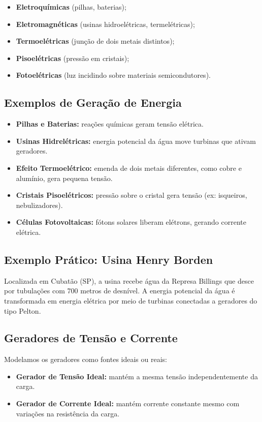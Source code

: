 \begin{itemize}
    \item \textbf{Eletroquímicas} (pilhas, baterias);
    \item \textbf{Eletromagnéticas} (usinas hidroelétricas, termelétricas);
    \item \textbf{Termoelétricas} (junção de dois metais distintos);
    \item \textbf{Pisoelétricas} (pressão em cristais);
    \item \textbf{Fotoelétricas} (luz incidindo sobre materiais semicondutores).
\end{itemize}

\subsection{Exemplos de Geração de Energia}
\begin{itemize}
    \item \textbf{Pilhas e Baterias:} reações químicas geram tensão elétrica.
    \item \textbf{Usinas Hidrelétricas:} energia potencial da água move turbinas que ativam geradores.
    \item \textbf{Efeito Termoelétrico:} emenda de dois metais diferentes, como cobre e alumínio, gera pequena tensão.
    \item \textbf{Cristais Pisoelétricos:} pressão sobre o cristal gera tensão (ex: isqueiros, nebulizadores).
    \item \textbf{Células Fotovoltaicas:} fótons solares liberam elétrons, gerando corrente elétrica.
\end{itemize}

\subsection*{Exemplo Prático: Usina Henry Borden}
Localizada em Cubatão (SP), a usina recebe água da Represa Billings que desce por tubulações com 700 metros de desnível. A energia potencial da água é transformada em energia elétrica por meio de turbinas conectadas a geradores do tipo Pelton.

\subsection{Geradores de Tensão e Corrente}
Modelamos os geradores como fontes ideais ou reais:

\begin{itemize}
    \item \textbf{Gerador de Tensão Ideal:} mantém a mesma tensão independentemente da carga.
    \item \textbf{Gerador de Corrente Ideal:} mantém corrente constante mesmo com variações na resistência da carga.
\end{itemize}

